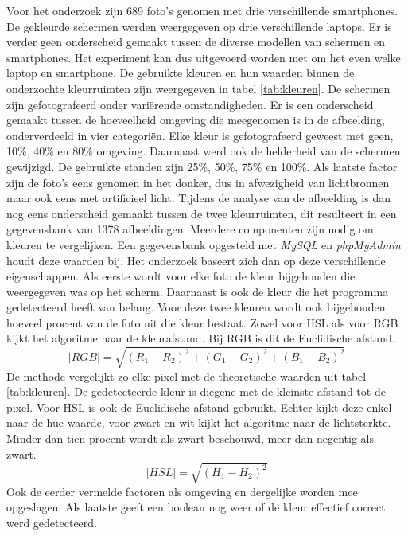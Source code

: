 Voor het onderzoek zijn 689 foto's genomen met drie verschillende smartphones. De gekleurde schermen werden weergegeven op drie verschillende laptops. Er is verder geen onderscheid gemaakt tussen de diverse modellen van schermen en smartphones. Het experiment kan dus uitgevoerd worden met om het even welke laptop en smartphone. De gebruikte kleuren en hun waarden binnen de onderzochte kleurruimten zijn weergegeven in tabel \ref{tab:kleuren}. De schermen zijn gefotografeerd onder variërende omstandigheden. Er is een onderscheid gemaakt tussen de hoeveelheid omgeving die meegenomen is in de afbeelding, onderverdeeld in vier categoriën. Elke kleur is gefotografeerd geweest met geen, 10\%, 40\% en 80\% omgeving. Daarnaast werd ook de helderheid van de schermen gewijzigd. De gebruikte standen zijn 25\%, 50\%, 75\% en 100\%. Als laatste factor zijn de foto's eens genomen in het donker, dus in afwezigheid van lichtbronnen maar ook eens met artificieel licht.  Tijdens de analyse van de afbeelding is dan nog eens onderscheid gemaakt tussen de twee kleurruimten, dit resulteert in een gegevensbank van 1378 afbeeldingen.  Meerdere componenten zijn nodig om kleuren te vergelijken. Een gegevensbank opgesteld met \textit{MySQL} en \textit{phpMyAdmin} houdt deze waarden bij. Het onderzoek baseert zich dan op deze verschillende eigenschappen. Als eerste wordt voor elke foto de kleur bijgehouden die weergegeven was op het scherm. Daarnaast is ook de kleur die het programma gedetecteerd heeft van belang. Voor deze twee kleuren wordt ook bijgehouden hoeveel procent van de foto uit die kleur bestaat. Zowel voor HSL als voor RGB kijkt het algoritme naar de kleurafstand. Bij RGB is dit de Euclidische afstand. 
$$ \mid RGB \mid = \sqrt{(R_1 - R_2)^2 + (G_1 - G_2)^2 + (B_1 - B_2)^2}$$
De methode vergelijkt zo elke pixel met de theoretische waarden uit tabel \ref{tab:kleuren}. De gedetecteerde kleur is diegene met de kleinste afstand tot de pixel. Voor HSL is ook de Euclidische afstand gebruikt. Echter kijkt deze enkel naar de hue-waarde, voor zwart en wit kijkt het algoritme naar de lichtsterkte. Minder dan tien procent wordt als zwart beschouwd, meer dan negentig als zwart. 
$$ \mid HSL \mid = \sqrt{(H_1 - H_2)^2 }$$
Ook de eerder vermelde factoren als omgeving en dergelijke worden mee opgeslagen. Als laatste geeft een boolean nog weer of de kleur effectief correct werd gedetecteerd.


